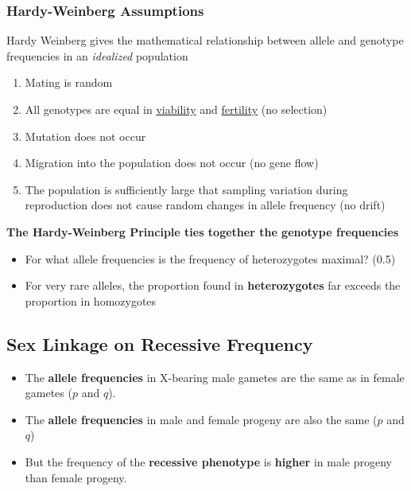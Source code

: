 \documentclass[10pt]{article}
\begin{document}
\subsubsection*{Hardy-Weinberg Assumptions}
Hardy Weinberg gives the mathematical relationship between allele and genotype frequencies in an \textit{idealized} population
\begin{enumerate}
	\item Mating is random
	\item All genotypes are equal in \underline{viability} and \underline{fertility} (no selection)
	\item Mutation does not occur
	\item Migration into the population does not occur (no gene flow)
	\item The population is sufficiently large that sampling variation during reproduction does not cause random changes in allele frequency (no drift)
\end{enumerate}

\textbf{The Hardy-Weinberg Principle ties together the genotype frequencies}
\begin{itemize}
	\item For what allele frequencies is the frequency of heterozygotes maximal?  (0.5)
	\item For very rare alleles, the proportion found in \textbf{heterozygotes} far exceeds the proportion in homozygotes
\end{itemize}

\subsection*{Sex Linkage on Recessive Frequency}
\begin{itemize}
	\item The \textbf{allele frequencies} in X-bearing male gametes are the same as in female gametes ($p$ and $q$).
	\item The \textbf{allele frequencies} in male and female progeny are also the same ($p$ and $q$)
	\item But the frequency of the \textbf{recessive phenotype} is \textbf{higher} in male progeny than female progeny.
\end{itemize}
\end{document}
